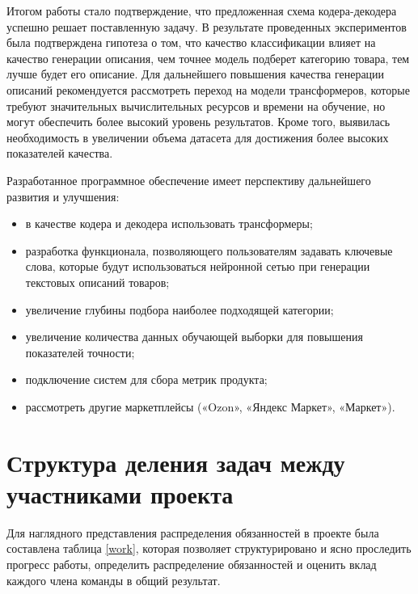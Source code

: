 \documentclass[a4paper,12pt]{extarticle}
\begin{document}
Итогом работы стало подтверждение, что предложенная схема кодера-декодера успешно решает поставленную задачу. В результате проведенных экспериментов была подтверждена гипотеза о том, что качество классификации влияет на качество генерации описания, чем точнее модель подберет категорию товара, тем лучше будет его описание. Для дальнейшего повышения качества генерации описаний рекомендуется рассмотреть переход на модели трансформеров, которые требуют значительных вычислительных ресурсов и времени на обучение, но могут обеспечить более высокий уровень результатов. Кроме того, выявилась необходимость в увеличении объема датасета для достижения более высоких показателей качества.

Разработанное программное обеспечение имеет перспективу дальнейшего развития и улучшения:
\begin{itemize}
	\item в качестве кодера и декодера использовать трансформеры;
	\item разработка функционала, позволяющего пользователям задавать ключевые слова, которые будут использоваться нейронной сетью при генерации текстовых описаний товаров;
	\item увеличение глубины подбора наиболее подходящей категории;
	\item увеличение количества данных обучающей выборки для повышения показателей точности;
	\item подключение систем для сбора метрик продукта;
	\item рассмотреть другие маркетплейсы («Ozon», «Яндекс Маркет», «Маркет»).
\end{itemize}

\newpage
\section*{Структура деления задач между участниками проекта}

Для наглядного представления распределения обязанностей в проекте была составлена таблица \ref{work}, которая позволяет структурировано и ясно проследить прогресс работы, определить распределение обязанностей и оценить вклад каждого члена команды в общий результат.
\end{document}
